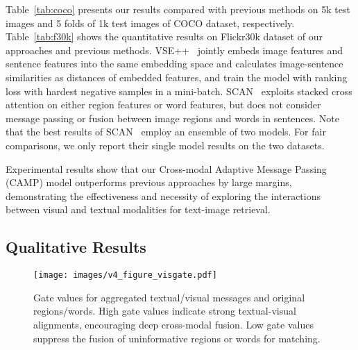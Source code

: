 \documentclass[10pt,twocolumn,letterpaper]{article}
\begin{document}
Table~\ref{tab:coco} presents our results compared with previous methods on 5k test images and 5 folds of 1k test images of COCO dataset, respectively. Table~\ref{tab:f30k} shows the quantitative results on Flickr30k dataset of our approaches and previous methods. VSE++~\cite{faghri2017vse++} jointly embeds image features and sentence features into the same embedding space and calculates image-sentence similarities as distances of embedded features, and train the model with ranking loss with hardest negative samples in a mini-batch. SCAN~\cite{lee2018stacked} exploits stacked cross attention on either region features or word features, but does not consider message passing or fusion between image regions and words in sentences. Note that the best results of SCAN~\cite{lee2018stacked} employ an ensemble of two models. For fair comparisons, we only report their single model results on the two datasets. 




Experimental results show that our Cross-modal Adaptive Message Passing (CAMP) model outperforms previous approaches by large margins, demonstrating the effectiveness and necessity of exploring the interactions between visual and textual modalities for text-image retrieval. 















\vspace{-1mm}
\subsection{Qualitative Results}
\label{sec:qualitative}

\begin{figure*}[t]
\begin{center}
   \texttt{[image: images/v4\_figure\_visgate.pdf]}
\end{center}
\vspace{-10pt}
   \caption{Gate values for aggregated textual/visual messages and original regions/words. High gate values indicate strong textual-visual alignments, encouraging deep cross-modal fusion. Low gate values suppress the fusion of uninformative regions or words for matching.}
\label{fig:visgate}
\vspace{-5mm}
\end{figure*}
\end{document}
